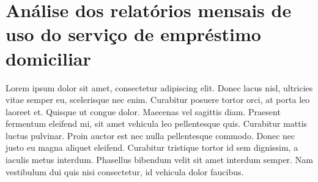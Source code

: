
{\let\clearpage\relax \chapter[Análise dos relatórios mensais de uso do serviço de emprésti\-mo domiciliar]{\textbf{Análise dos relatórios mensais de uso do serviço de empréstimo domiciliar}}}

Lorem ipsum dolor sit amet, consectetur adipiscing elit. Donec lacus nisl, ultricies vitae semper eu, scelerisque nec enim. Curabitur posuere tortor orci, at porta leo laoreet et. Quisque ut congue dolor. Maecenas vel sagittis diam. Praesent fermentum eleifend mi, sit amet vehicula leo pellentesque quis. Curabitur mattis luctus pulvinar. Proin auctor est nec nulla pellentesque commodo. Donec nec justo eu magna aliquet eleifend. Curabitur tristique tortor id sem dignissim, a iaculis metus interdum. Phasellus bibendum velit sit amet interdum semper. Nam vestibulum dui quis nisi consectetur, id vehicula dolor faucibus.
